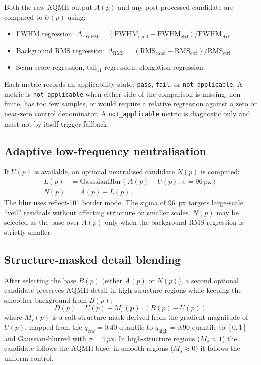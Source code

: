 \documentclass[10pt,twocolumn]{article}
\begin{document}
Both the raw AQMH output $A(p)$ and any post-processed candidate are compared to $U(p)$ using:
\begin{itemize}
  \item FWHM regression: $\Delta_{\mathrm{FWHM}} = (\mathrm{FWHM}_{\mathrm{cand}} - \mathrm{FWHM}_{\mathrm{ctrl}}) / \mathrm{FWHM}_{\mathrm{ctrl}}$
  \item Background RMS regression: $\Delta_{\mathrm{RMS}} = (\mathrm{RMS}_{\mathrm{cand}} - \mathrm{RMS}_{\mathrm{ctrl}}) / \mathrm{RMS}_{\mathrm{ctrl}}$
  \item Seam score regression, tail$_{11}$ regression, elongation regression.
\end{itemize}
Each metric records an applicability state: \texttt{pass}, \texttt{fail}, or
\texttt{not\_applicable}. A metric is \texttt{not\_applicable} when either side of the comparison
is missing, non-finite, has too few samples, or would require a relative regression against a
zero or near-zero control denominator. A \texttt{not\_applicable} metric is diagnostic only and
must not by itself trigger fallback.

\subsection{Adaptive low-frequency neutralisation}

If $U(p)$ is available, an optional neutralised candidate $N(p)$ is computed:
\begin{equation}
\begin{split}
  L(p) &= \mathrm{GaussianBlur}(A(p) - U(p),\, \sigma = 96\,\mathrm{px}) \\
  N(p) &= A(p) - L(p).
\end{split}
\end{equation}
The blur uses reflect-101 border mode. The sigma of \SI{96}{px} targets large-scale ``veil''
residuals without affecting structure on smaller scales. $N(p)$ may be selected as the base over
$A(p)$ only when the background RMS regression is strictly smaller.

\subsection{Structure-masked detail blending}

After selecting the base $B(p)$ (either $A(p)$ or $N(p)$), a second optional candidate preserves
AQMH detail in high-structure regions while keeping the smoother background from $B(p)$:
\begin{equation}
  D(p) = U(p) + M_s(p) \cdot (B(p) - U(p))
\end{equation}
where $M_s(p)$ is a soft structure mask derived from the gradient magnitude of $U(p)$, mapped
from the $q_{\mathrm{low}} = 0.40$ quantile to $q_{\mathrm{high}} = 0.90$ quantile to $[0, 1]$
and Gaussian-blurred with $\sigma = \SI{4}{px}$. In high-structure regions ($M_s \approx 1$) the
candidate follows the AQMH base; in smooth regions ($M_s \approx 0$) it follows the uniform
control.
\end{document}
